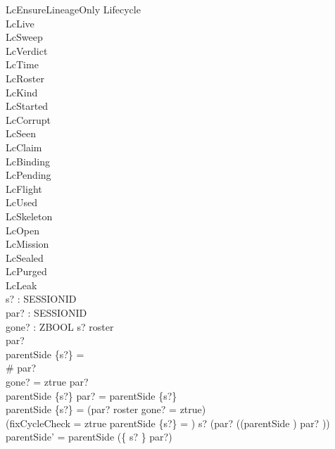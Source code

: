 \documentclass[a4paper,10pt,fleqn]{article}
\begin{document}
\begin{schema}{LcEnsureLineageOnly}
\Delta Lifecycle \\
\Xi LcLive \\
\Xi LcSweep \\
\Xi LcVerdict \\
\Xi LcTime \\
\Xi LcRoster \\
\Xi LcKind \\
\Xi LcStarted \\
\Xi LcCorrupt \\
\Xi LcSeen \\
\Xi LcClaim \\
\Xi LcBinding \\
\Xi LcPending \\
\Xi LcFlight \\
\Xi LcUsed \\
\Xi LcSkeleton \\
\Xi LcOpen \\
\Xi LcMission \\
\Xi LcSealed \\
\Xi LcPurged \\
\Xi LcLeak \\
s? : SESSIONID \\
par? : \power SESSIONID \\
gone? : ZBOOL
\where
s? \notin roster \\
par? \neq \emptyset \\
parentSide \limg \{s?\} \rimg = \emptyset \\
\# par?  \\
gone? = ztrue \implies par? \neq \emptyset \\
parentSide \limg \{s?\} \rimg \neq \emptyset \implies par? = parentSide \limg \{s?\} \rimg \\
parentSide \limg \{s?\} \rimg = \emptyset \implies (par? \subseteq roster \lor gone? = ztrue) \\
(fixCycleCheck = ztrue \land parentSide \limg \{s?\} \rimg = \emptyset) \implies s? \notin (par? \cup ((parentSide \plus) \limg par? \rimg)) \\
parentSide' = parentSide \cup (\{ s? \} \cross par?)
\end{schema}
\end{document}

